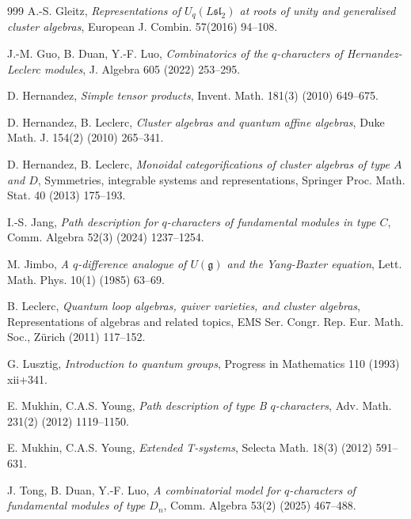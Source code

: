 \documentclass[12pt, reqno]{amsart}
\numberwithin{equation}{section}
\begin{document}
\begin{thebibliography}{999}
 A.-S. Gleitz, \textit{Representations of $U_q(L\mathfrak{sl}_2)$ at roots of unity and generalised cluster algebras}, European J. Combin. 57(2016) 94--108.

 J.-M. Guo, B. Duan, Y.-F. Luo, \textit{Combinatorics of the $q$-characters of Hernandez-Leclerc modules}, J. Algebra 605 (2022) 253--295.

 D. Hernandez, \textit{Simple tensor products}, Invent. Math. 181(3) (2010) 649--675.

 D. Hernandez, B. Leclerc, \textit{Cluster algebras and quantum affine algebras}, Duke Math. J. 154(2) (2010) 265--341.

 D. Hernandez, B. Leclerc, \textit{Monoidal categorifications of cluster algebras of type $A$ and $D$}, Symmetries, integrable systems and representations, Springer Proc. Math. Stat. 40 (2013) 175--193.

 I.-S. Jang, \textit{Path description for $q$-characters of fundamental modules in type $C$}, Comm. Algebra 52(3) (2024) 1237--1254.

 M. Jimbo, \textit{A $q$-difference analogue of $U(\mathfrak{g})$ and the Yang-Baxter equation}, Lett. Math. Phys. 10(1) (1985) 63--69.

 B. Leclerc, \textit{Quantum loop algebras, quiver varieties, and cluster algebras}, Representations of algebras and related topics, EMS Ser. Congr. Rep. Eur. Math. Soc., Z\"urich (2011) 117--152.

 G. Lusztig, \textit{Introduction to quantum groups}, Progress in Mathematics 110 (1993) xii+341.

 E. Mukhin, C.A.S. Young, \textit{Path description of type B $q$-characters}, Adv. Math. 231(2) (2012) 1119--1150.

 E. Mukhin, C.A.S. Young, \textit{Extended T-systems}, Selecta Math. 18(3) (2012) 591--631.

 J. Tong, B. Duan, Y.-F. Luo, \textit{A combinatorial model for $q$-characters of fundamental modules of type $D_n$}, Comm. Algebra 53(2) (2025) 467--488.
\end{thebibliography}
\end{document}
